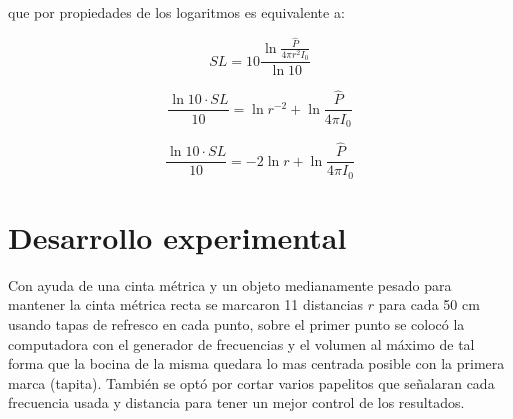 \documentclass[DIV=calc, paper=a4, fontsize=11pt]{scrartcl}
\begin{document}
\begin{multicols}{2}
\noindent que por propiedades de los logaritmos es equivalente a:

\begin{equation*}
    SL = 10 \frac{\ln{\frac{\hat{P}}{4 \pi r^2 I_0}}}{\ln{10}}
\end{equation*}

\begin{equation*}
    \frac{\ln{10}\cdot SL}{10} = \ln{r^{-2}}+ \ln{\frac{\hat{P}}{4 \pi I_0}}
\end{equation*}

\begin{equation}
    \frac{\ln{10}\cdot SL}{10} =-2 \ln{r}+ \ln{\frac{\hat{P}}{4 \pi I_0}}
\end{equation}










\section*{Desarrollo experimental}

Con ayuda de una cinta métrica y un objeto medianamente pesado para mantener la cinta métrica recta se marcaron 11 distancias $r$ para cada 50 cm usando tapas de refresco en cada punto, sobre el primer punto se colocó la computadora con el generador de frecuencias y el volumen al máximo de tal forma que la bocina de la misma quedara lo mas centrada posible con la primera marca (tapita). También se optó por cortar varios papelitos que señalaran cada frecuencia usada y distancia para tener un mejor control de los resultados.


\end{multicols}
\end{document}
